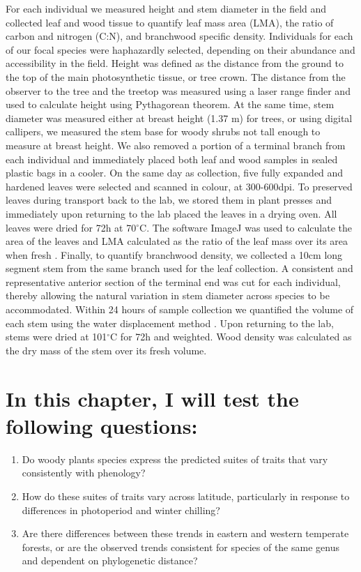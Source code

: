 \documentclass[11pt,a4paper,oneside]{article}
\begin{document}
\par For each individual we measured height and stem diameter in the field and collected leaf and wood tissue to quantify leaf mass area (LMA), the ratio of carbon and nitrogen (C:N), and branchwood specific density. Individuals for each of our focal species were haphazardly selected, depending on their abundance and accessibility in the field. Height was defined as the distance from the ground to the top of the main photosynthetic tissue, or tree crown. The distance from the observer to the tree and the treetop was measured using a laser range finder and used to calculate height using Pythagorean theorem. At the same time, stem diameter was measured either at breast height (1.37 m) for trees, or using digital callipers, we measured the stem base for woody shrubs not tall enough to measure at breast height.  We also removed a portion of a terminal branch from each individual and immediately placed both leaf and wood samples in sealed plastic bags in a cooler. On the same day as collection, five fully expanded and hardened leaves were selected and scanned in colour, at 300-600dpi. To preserved leaves during transport back to the lab, we stored them in plant presses and immediately upon returning to the lab placed the leaves in a drying oven. All leaves were dried for 72h at 70$^\circ$C. The software ImageJ was used to calculate the area of the leaves and LMA calculated as the ratio of the leaf mass over its area when fresh \cite{Perez-Harguindeguy2013}. Finally, to quantify branchwood density, we collected a 10cm long segment stem from the same branch used for the leaf collection. A consistent and representative anterior section of the terminal end was cut for each individual, thereby allowing the natural variation in stem diameter across species to be accommodated. Within 24 hours of sample collection we quantified the volume of each stem using the water displacement method \cite{Perez-Harguindeguy2013}. Upon returning to the lab, stems were dried at 101$^\circ$C for 72h and weighted. Wood density was calculated as the dry mass of the stem over its fresh volume.  


\section*{In this chapter, I will test the following questions:}
\begin{enumerate}
\item Do woody plants species express the predicted suites of traits that vary consistently with phenology? 
\item How do these suites of traits vary across latitude, particularly in response to differences in photoperiod and winter chilling?
\item Are there differences between these trends in eastern and western temperate forests, or are the observed trends consistent for species of the same genus and dependent on phylogenetic distance?

\end{enumerate}
\par %
\end{document}
